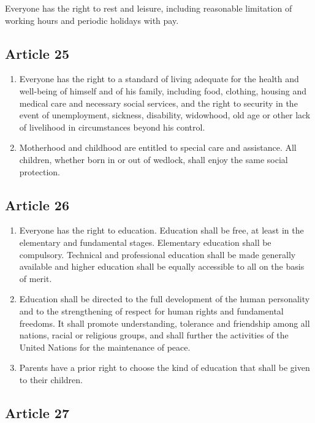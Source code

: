 \documentclass[
  ngerman,
  american,
  titlepage,
  openright,
  DIV=calc,
  toc=listof,
  listof=nochaptergap]{scrbook}
\begin{document}
Everyone has the right to rest and leisure, including reasonable
limitation of working hours and periodic holidays with pay.

\subsection{Article 25}\label{article-25-3}

\begin{enumerate}
\def\labelenumi{\arabic{enumi}.}
\item
  Everyone has the right to a standard of living adequate for the health
  and well-being of himself and of his family, including food, clothing,
  housing and medical care and necessary social services, and the right
  to security in the event of unemployment, sickness, disability,
  widowhood, old age or other lack of livelihood in circumstances beyond
  his control.
\item
  Motherhood and childhood are entitled to special care and assistance.
  All children, whether born in or out of wedlock, shall enjoy the same
  social protection.
\end{enumerate}

\subsection{Article 26}\label{article-26-3}

\begin{enumerate}
\def\labelenumi{\arabic{enumi}.}
\item
  Everyone has the right to education. Education shall be free, at least
  in the elementary and fundamental stages. Elementary education shall
  be compulsory. Technical and professional education shall be made
  generally available and higher education shall be equally accessible
  to all on the basis of merit.
\item
  Education shall be directed to the full development of the human
  personality and to the strengthening of respect for human rights and
  fundamental freedoms. It shall promote understanding, tolerance and
  friendship among all nations, racial or religious groups, and shall
  further the activities of the United Nations for the maintenance of
  peace.
\item
  Parents have a prior right to choose the kind of education that shall
  be given to their children.
\end{enumerate}

\subsection{Article 27}\label{article-27-3}
\end{document}
